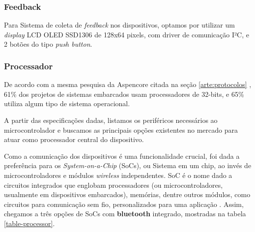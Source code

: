 \documentclass[../monografia.tex]{subfiles}
\begin{document}
\subsubsection{Feedback}

Para Sistema de coleta de \textit{feedback} nos dispositivos, optamos por utilizar um \textit{display} LCD OLED \cite{oled} SSD1306 de 128x64 pixels, com driver de comunicação I²C, e 2 botões do tipo \textit{push button}. 

\subsubsection{Processador}

De acordo com a mesma pesquisa da Aspencore citada na seção \ref{arte:protocolos} \cite{embedded-market-study}, 61\% dos projetos de sistemas embarcados usam processadores de 32-bits, e 65\% utiliza algum tipo de sistema operacional. 

A partir das especificações dadas, listamos os periféricos necessários ao microcontrolador e buscamos as principais opções existentes no mercado para atuar como processador central do dispositivo. 

Como a comunicação dos dispositivos é uma funcionalidade crucial, foi dada a preferência para os \textit{System-on-a-Chip} (SoCs), ou Sistema em um chip, ao invés de microcontroladores e módulos \textit{wireless} independentes. SoC é o nome dado a circuitos integrados que englobam processadores (ou microcontroladores, usualmente em dispositivos embarcados), memórias, dentre outros módulos, como circuitos para comunicação sem fio, personalizados para uma aplicação \cite{soc}. Assim, chegamos a três opções de SoCs com \textbf{bluetooth} integrado, mostradas na tabela \ref{table-processor}.
\end{document}
